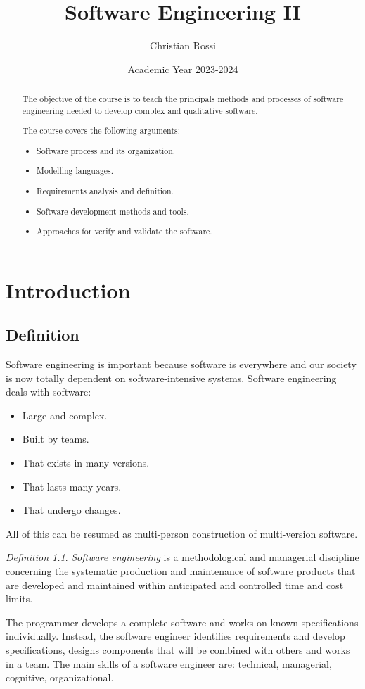 \documentclass[12pt, a4paper]{report}
\title{Software Engineering II}
\author{Christian Rossi}
\date{Academic Year 2023-2024}
\theoremstyle{remark}
\newtheorem*{remark}{Definition}
\begin{document}
\maketitle

\newpage

\begin{abstract}
    The objective of the course is to teach the principals methods and processes of software engineering needed to develop complex and qualitative software.
    \par
    The course covers the following arguments:
    \begin{itemize}
        \item Software process and its organization.
        \item Modelling languages.
        \item Requirements analysis and definition.
        \item Software development methods and tools.
        \item Approaches for verify and validate the software.
    \end{itemize}
\end{abstract}

\newpage

\tableofcontents

\newpage

\chapter{Introduction}
\section{Definition}
    Software engineering is important because software is everywhere and our society is now totally dependent on software-intensive systems. Software engineering deals with software: 
    \begin{itemize}
        \item Large and complex.
        \item Built by teams.
        \item That exists in many versions.
        \item That lasts many years.
        \item That undergo changes.
    \end{itemize}
    All of this can be resumed as multi-person construction of multi-version software. 
    \begin{remark}
        \emph{Software engineering} is a methodological and managerial discipline concerning the systematic production and maintenance of software products that are developed and maintained within anticipated and controlled time and cost limits.
    \end{remark}
    \par
    The programmer develops a complete software and works on known specifications individually. Instead, the software engineer identifies requirements and develop specifications, designs components that will be combined with others and works in a team. The main skills of a software engineer are: technical, managerial, cognitive, organizational.
\end{document}
